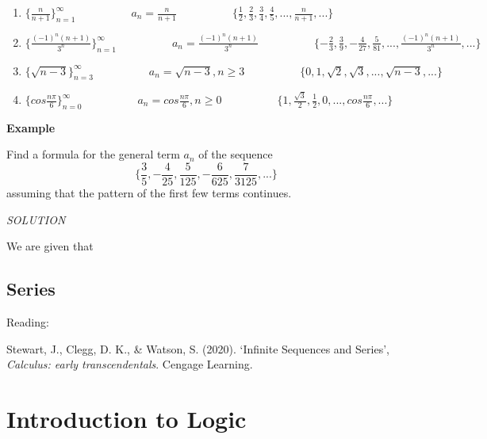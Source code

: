 \documentclass[]{book}
\begin{document}
\begin{enumerate}
\def\labelenumi{\alph{enumi})}
\item
  \(\{\frac{n}{n+1}\}_{n=1}^{\infty} \hspace{5em} a_{n} = \frac{n}{n+1}\hspace{5em}\{\frac{1}{2},\frac{2}{3}, \frac{3}{4}, \frac{4}{5},..., \frac{n}{n+1},... \}\)
\item
  \(\{\frac{(-1)^n(n+1)}{3^{n}}\}_{n=1}^{\infty} \hspace{5em} a_{n} = \frac{(-1)^n(n+1)}{3^{n}}\hspace{5em}\{-\frac{2}{3},\frac{3}{9}, -\frac{4}{27}, \frac{5}{81},..., \frac{(-1)^n(n+1)}{3^{n}},... \}\)
\item
  \(\{\sqrt{n-3}\}_{n=3}^{\infty} \hspace{5em} a_{n} = \sqrt{n-3}, n\geq3\hspace{5em}\{0,1,\sqrt{2}, \sqrt{3},..., \sqrt{n-3},...\}\)
\item
  \(\{cos\frac{n\pi}{6}\}_{n=0}^{\infty} \hspace{5em} a_{n} = cos\frac{n\pi}{6}, n\geq 0 \hspace{5em}\{1, \frac{\sqrt{3}}{2},\frac{1}{2}, 0,...,cos\frac{n\pi}{6},...\}\)
\end{enumerate}

\textbf{Example}

Find a formula for the general term \(a_{n}\) of the sequence
\[\{\frac{3}{5},-\frac{4}{25}, \frac{5}{125}, -\frac{6}{625}, \frac{7}{3125},...\}\]
assuming that the pattern of the first few terms continues.

\emph{SOLUTION}

We are given that

\hypertarget{series}{%
\section{Series}\label{series}}

Reading:

Stewart, J., Clegg, D. K., \& Watson, S. (2020). `Infinite Sequences and Series', \emph{Calculus: early transcendentals}. Cengage Learning.

\hypertarget{introduction-to-logic}{%
\chapter{Introduction to Logic}\label{introduction-to-logic}}

\end{document}
